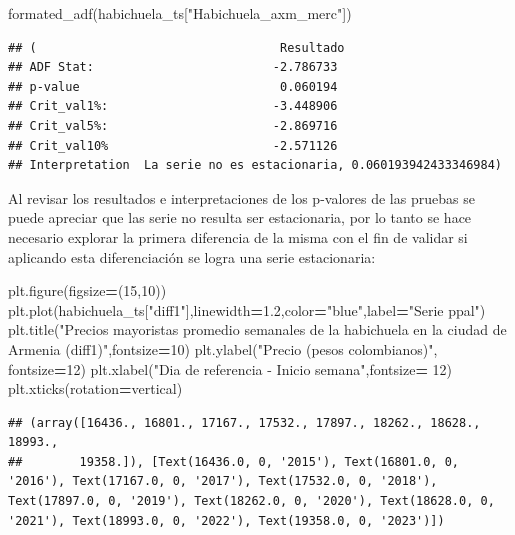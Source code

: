 \documentclass[
]{book}
\newenvironment{Shaded}{\begin{snugshade}}{\end{snugshade}}
\newcommand{\DecValTok}[1]{\textcolor[rgb]{0.00,0.00,0.81}{#1}}
\newcommand{\FloatTok}[1]{\textcolor[rgb]{0.00,0.00,0.81}{#1}}
\newcommand{\NormalTok}[1]{#1}
\newcommand{\OperatorTok}[1]{\textcolor[rgb]{0.81,0.36,0.00}{\textbf{#1}}}
\newcommand{\StringTok}[1]{\textcolor[rgb]{0.31,0.60,0.02}{#1}}
\begin{document}
\begin{Shaded}
\begin{Highlighting}[]
\NormalTok{formated\_adf(habichuela\_ts[}\StringTok{"Habichuela\_axm\_merc"}\NormalTok{])}
\end{Highlighting}
\end{Shaded}

\begin{verbatim}
## (                                  Resultado
## ADF Stat:                         -2.786733
## p-value                            0.060194
## Crit_val1%:                       -3.448906
## Crit_val5%:                       -2.869716
## Crit_val10%                       -2.571126
## Interpretation  La serie no es estacionaria, 0.060193942433346984)
\end{verbatim}

Al revisar los resultados e interpretaciones de los p-valores de las pruebas se puede apreciar que las serie no resulta ser estacionaria, por lo tanto se hace necesario explorar la primera diferencia de la misma con el fin de validar si aplicando esta diferenciación se logra una serie estacionaria:

\begin{Shaded}
\begin{Highlighting}[]

\NormalTok{plt.figure(figsize}\OperatorTok{=}\NormalTok{(}\DecValTok{15}\NormalTok{,}\DecValTok{10}\NormalTok{))}
\NormalTok{plt.plot(habichuela\_ts[}\StringTok{"diff1"}\NormalTok{],linewidth}\OperatorTok{=}\FloatTok{1.2}\NormalTok{,color}\OperatorTok{=}\StringTok{"blue"}\NormalTok{,label}\OperatorTok{=}\StringTok{"Serie ppal"}\NormalTok{)}
\NormalTok{plt.title(}\StringTok{"Precios mayoristas promedio semanales de la habichuela en la ciudad de Armenia (diff1)"}\NormalTok{,fontsize}\OperatorTok{=}\DecValTok{10}\NormalTok{)}
\NormalTok{plt.ylabel(}\StringTok{"Precio (pesos colombianos)"}\NormalTok{, fontsize}\OperatorTok{=}\DecValTok{12}\NormalTok{)}
\NormalTok{plt.xlabel(}\StringTok{"Dia de referencia {-} Inicio semana"}\NormalTok{,fontsize}\OperatorTok{=} \DecValTok{12}\NormalTok{)}
\NormalTok{plt.xticks(rotation}\OperatorTok{=}\StringTok{\textquotesingle{}vertical\textquotesingle{}}\NormalTok{)}
\end{Highlighting}
\end{Shaded}

\begin{verbatim}
## (array([16436., 16801., 17167., 17532., 17897., 18262., 18628., 18993.,
##        19358.]), [Text(16436.0, 0, '2015'), Text(16801.0, 0, '2016'), Text(17167.0, 0, '2017'), Text(17532.0, 0, '2018'), Text(17897.0, 0, '2019'), Text(18262.0, 0, '2020'), Text(18628.0, 0, '2021'), Text(18993.0, 0, '2022'), Text(19358.0, 0, '2023')])
\end{verbatim}
\end{document}
